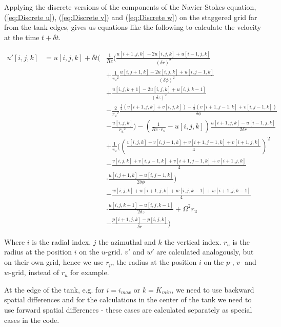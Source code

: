 \documentclass[12pt, a4paper]{article} %
\begin{document}
			Applying the discrete versions of the components of the Navier-Stokes equation, (\ref{eq:Discrete u}), (\ref{eq:Discrete v}) and (\ref{eq:Discrete w}) on the staggered grid far from the tank edges, gives us equations like the following to calculate the velocity at the time $t + \delta t$.
			
			{\allowdisplaybreaks
			\begin{eqnarray}
				u'[i,j,k] &= u[i,j,k] + \delta t \Bigg(& \frac{1}{Re}\Bigg(\frac{u[i+1,j,k]-2u[i,j,k]+u[i-1,j,k]}{(\delta r)^2}
				\nonumber \\
				&& + \frac{1}{{r_u}^2}\frac{u[i,j+1,k]-2u[i,j,k]+u[i,j-1,k]}{(\delta \phi)^2}
				\nonumber \\
				&& + \frac{u[i,j,k+1] - 2u[i,j,k] +u[i,j,k-1]}{(\delta z)^2}
				\nonumber \\
				&& - \frac{2}{{r_u}^2}\frac{\frac{1}{2}\left(v[i+1,j,k]+v[i,j,k]\right)-\frac{1}{2}\left(v[i+1,j-1,k]+v[i,j-1,k]\right)}{\delta \phi}
				\nonumber \\
				&& - \frac{u[i,j,k]}{{r_u}^2}\Bigg) - \left(\frac{1}{Re\cdot r_u} - u[i,j,k]\right)\frac{u[i+1,j,k]-u[i-1,j,k]}{2\delta r}
				\nonumber \\
				&& + \frac{1}{r_u}\Bigg(\left(\frac{v[i,j,k]+v[i,j-1,k]+v[i+1,j-1,k]+v[i+1,j,k]}{4}\right)^2
				\nonumber \\
				&& - \frac{v[i,j,k]+v[i,j-1,k]+v[i+1,j-1,k]+v[i+1,j,k]}{4}
				\nonumber \\
				&&\cdot \frac{u[i,j+1,k]-u[i,j-1,k]}{2\delta \phi}\Bigg)
				\nonumber \\
				&& - \frac{w[i,j,k]+w[i+1,j,k]+w[i,j,k-1]+w[i+1,j,k-1]}{4}
				\nonumber \\
				&&\cdot \frac{u[i,j,k+1]-u[i,j,k-1]}{2\delta z} + \Omega^2 r_u
				\nonumber \\
				&& - \frac{p[i+1,j,k]-p[i,j,k]}{\delta r} \Bigg)
			\end{eqnarray}
			}
			
			Where $i$ is the radial index, $j$ the azimuthal and $k$ the vertical index. $r_u$ is the radius at the position $i$ on the $u$-grid. $v'$ and $w'$ are calculated analogously, but on their own grid, hence we use $r_p$, the radius at the position $i$ on the $p$-, $v$- and $w$-grid, instead of $r_u$ for example.
			
			At the edge of the tank, e.g. for $i=i_{max}$ or $k=K_{min}$, we need to use backward spatial differences and for the calculations in the center of the tank we need to use forward spatial differences - these cases are calculated separately as special cases in the code.\\
			
\end{document}
